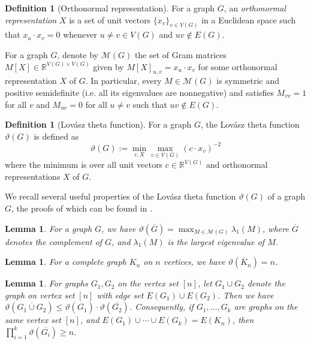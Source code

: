 \documentclass[reqno]{amsart}
\newtheorem{lemma}[theorem]{Lemma}
\theoremstyle{remark}
\theoremstyle{definition}
\newtheorem{definition}[theorem]{Definition}
\numberwithin{theorem}{section}
\renewcommand{\le}{\leqslant}
\renewcommand{\ge}{\geqslant}
\newcommand{\ov}[1]{\overline{#1}}
\begin{document}
\begin{definition}[Orthonormal representation]
    For a graph $G$, an \emph{orthonormal representation} $X$ is a set of unit vectors $\{x_v\}_{v\in V(G)}$ in a Euclidean space such that $x_u\cdot x_v = 0$ whenever $u\ne v\in V(G)$ and $uv\not\in E(G)$.
\end{definition}

For a graph $G$, denote by $\mathcal M(G)$ 
the set of Gram matrices $M[X]\in \mathbb{R}^{V(G)\times V(G)}$ given by $M[X]_{u,v} = x_u\cdot x_v$ for some orthonormal representation $X$ of $G$. In particular, every $M\in \mathcal{M}(G)$ is symmetric and positive semidefinite (i.e. all its eigenvalues are nonnegative) and satisfies $M_{vv}=1$ for all $v$ and $M_{uv}=0$ for all $u\neq v$ such that $uv\notin E(G)$.

\begin{definition}[Lov\'asz theta function]
    For a graph $G$, the Lov\'asz theta function $\vartheta(G)$ is defined as 
    \[\vartheta(G) := \min_{c,X}\max_{v\in V(G)}(c\cdot x_v)^{-2}\]
    where the minimum is over all unit vectors $c\in \mathbb{R}^{V(G)}$ and orthonormal representations $X$ of $G$.
\end{definition}

 We recall several useful properties of the Lov\'asz theta function $\vartheta(G)$ of a graph $G$, the proofs of which can be found in \cite{JanzerYip2026ShortMonochromaticOddCycles}.

\begin{lemma}\label{lem:spectral-theta}
    For a graph $G$, we have $\vartheta(\ov G)=\max_{M\in\mathcal M(G)}\lambda_1(M)$, where $\ov G$ denotes the complement of $G$, and $\lambda_1(M)$ is the largest eigenvalue of $M$.
\end{lemma}

\begin{lemma}\label{lem:theta-complete-graph}
    For a complete graph $K_n$ on $n$ vertices, we have $\vartheta(\ov K_n) = n$.
\end{lemma}

\begin{lemma}\label{lem:submultiplicative}
    For graphs $G_1, G_2$ on the vertex set $[n]$, let $G_1\cup G_2$ denote the graph on vertex set $[n]$ with edge set $E(G_1)\cup E(G_2)$. Then we have $\vartheta(\ov{G_1\cup G_2})\le \vartheta(\ov{G_1})\cdot \vartheta(\ov{G_2})$. Consequently, if $G_1,\dots,G_k$ are graphs on the same vertex set $[n]$, and  $E(G_1)\cup\cdots\cup E(G_k) = E(K_n)$, then $\prod_{i=1}^k \vartheta(\ov{G_i})\ge n$.
\end{lemma}
\end{document}
